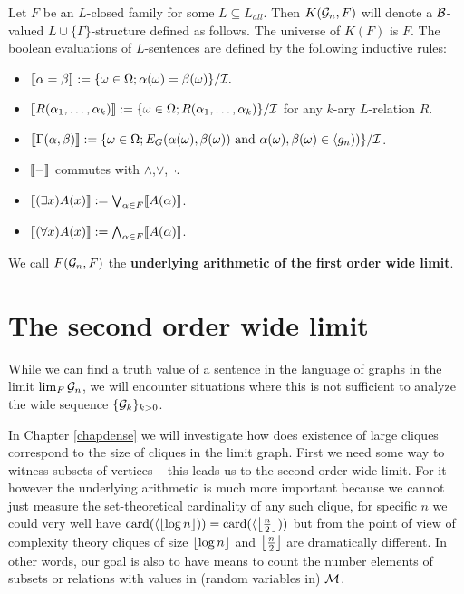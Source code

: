 \begin{defi}
Let $F$ be an $L$-closed family for some $L\subseteq L_{all}$. Then $K(\mathcal{G}_n,F)$ will denote a $\mathcal{B}$-valued $L\cup\{\Gamma\}$-structure defined as follows. The universe of $K(F)$ is $F$. The boolean evaluations of $L$-sentences are defined by the following inductive rules:

\begin{itemize}
\item $\llbracket \alpha=\beta \rrbracket := \{\omega\in\Omega; \alpha(\omega)=\beta(\omega)\}/\mathcal{I}.$
\item $\llbracket R(\alpha_1,\dots,\alpha_k) \rrbracket := \{\omega\in\Omega; R(\alpha_1,\dots,\alpha_k)\}/\mathcal{I}$ for any $k$-ary $L$-relation $R$.
\item $\llbracket \Gamma(\alpha,\beta) \rrbracket := \{\omega\in\Omega; E_G(\alpha(\omega),\beta(\omega))\text{ and }\alpha(\omega),\beta(\omega)\in\langle g_n))\}/\mathcal{I}$.
\item $\llbracket-\rrbracket$ commutes with $\land$,$\lor$,$\lnot$.
\item $\llbracket(\exists x)A(x)\rrbracket:=\bigvee_{\alpha\in F}\llbracket A(\alpha)\rrbracket$.
\item $\llbracket(\forall x)A(x)\rrbracket:=\bigwedge_{\alpha\in F}\llbracket A(\alpha)\rrbracket$.
\end{itemize}

We call $F(\mathcal{G}_n,F)$ the \textbf{underlying arithmetic of the first order wide limit}.
\end{defi}


\section{The second order wide limit}

While we can find a truth value of a sentence in the language of graphs in the limit $\lim_{F}\mathcal{G}_n$, we will encounter situations where this is not sufficient to analyze the wide sequence $\{\mathcal{G}_k\}_{k>0}$. 

In Chapter \ref{chapdense} we will investigate how does existence of large cliques correspond to the size of cliques in the limit graph. First we need some way to witness subsets of vertices -- this leads us to the second order wide limit. For it however the underlying arithmetic is much more important because we cannot just measure the set-theoretical cardinality of any such clique, for specific $n$ we could very well have $\text{card}(\langle \left \lfloor {\log{n}} \right \rfloor))=\text{card}(\langle \left \lfloor {\frac{n}{2}} \right \rfloor))$ but from the point of view of complexity theory cliques of size $\left \lfloor {\log n} \right \rfloor$ and $\left \lfloor {\frac{n}{2}} \right \rfloor$ are dramatically different. In other words, our goal is also to have means to count the number elements of subsets or relations with values in (random variables in) $\mathcal{M}$.

